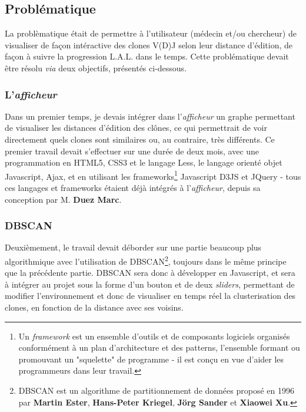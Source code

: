 \documentclass[12pt]{report}
\begin{document}
\begin{spacing}{1.2}
\subsection{Problématique}
La problèmatique était de permettre à l'utilisateur (médecin et/ou chercheur) de visualiser de façon intéractive des clones V(D)J selon leur distance d'édition, de façon à suivre la progression L.A.L. dans le temps.
\newline
Cette problématique devait être résolu \textit{via} deux objectifs, présentés ci-dessous. 

\subsubsection{L'\textit{afficheur}}
Dans un premier temps, je devais intégrer dans l'\textit{afficheur} un graphe permettant de visualiser les distances d'édition des clônes, ce qui permettrait de voir directement quels clones sont similaires ou, au contraire, très différents.
\newline
Ce premier travail devait s'effectuer sur une durée de deux mois, avec une programmation en HTML5, CSS3 et le langage Less, le langage orienté objet Javascript, Ajax, et en utilisant les frameworks\footnote{Un \textit{framework} est un ensemble d'outils et de composants logiciels organisés conformément à un plan d'architecture et des patterns, l'ensemble formant ou promouvant un "squelette" de programme - il est conçu en vue d'aider les programmeurs dans leur travail.} Javascript D3JS et JQuery - tous ces langages et frameworks étaient déjà intégrés à l'\textit{afficheur}, depuis sa conception par M. \textbf{Duez Marc}.

\subsubsection{DBSCAN}
Deuxièmement, le travail devait déborder sur une partie beaucoup plus algorithmique avec l'utilisation de DBSCAN\footnote{DBSCAN est un algorithme de partitionnement de données proposé en 1996 par \textbf{Martin Ester}, \textbf{Hans-Peter Kriegel}, \textbf{Jörg Sander} et \textbf{Xiaowei Xu}.}, toujours dans le même principe que la précédente partie.
\newline
DBSCAN sera donc à développer en Javascript, et sera à intégrer au projet sous la forme d'un bouton et de deux \textit{sliders}, permettant de modifier l'environnement et donc de visualiser en temps réel la clusterisation des clones, en fonction de la distance avec ses voisins.


\end{spacing}
\end{document}
